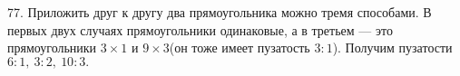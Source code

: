 77. Приложить друг к другу два прямоугольника можно тремя способами. В первых двух случаях прямоугольники одинаковые, а в третьем --- это прямоугольники $3\times1$ и $9\times3$(он тоже имеет пузатость $3:1$). Получим пузатости $6:1,\ 3:2,\ 10:3.$
\begin{center}
\begin{figure}[ht!]
\end{figure}
\end{center}
